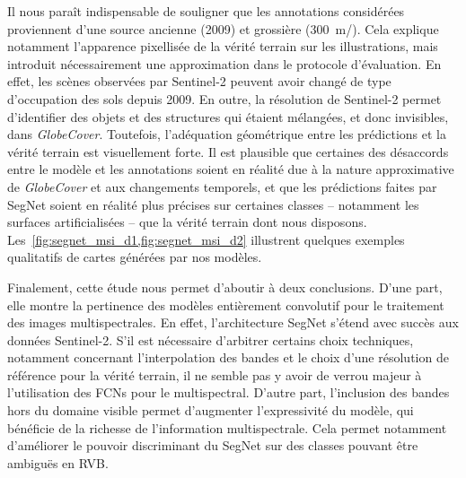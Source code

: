 Il nous paraît indispensable de souligner que les annotations considérées proviennent d'une source ancienne (2009) et grossière (\SI{300}{\meter/\px}). Cela explique notamment l'apparence pixellisée de la vérité terrain sur les illustrations, mais introduit nécessairement une approximation dans le protocole d'évaluation. En effet, les scènes observées par Sentinel-2 peuvent avoir changé de type d'occupation des sols depuis 2009. En outre, la résolution de Sentinel-2 permet d'identifier des objets et des structures qui étaient mélangées, et donc invisibles, dans \emph{GlobeCover}. Toutefois, l'adéquation géométrique entre les prédictions et la vérité terrain est visuellement forte. Il est plausible que certaines des désaccords entre le modèle et les annotations soient en réalité due à la nature approximative de \emph{GlobeCover} et aux changements temporels, et que les prédictions faites par SegNet soient en réalité plus précises sur certaines classes -- notamment les surfaces artificialisées -- que la vérité terrain dont nous disposons. Les~\cref{fig:segnet_msi_d1,fig:segnet_msi_d2} illustrent quelques exemples qualitatifs de cartes générées par nos modèles.

Finalement, cette étude nous permet d'aboutir à deux conclusions. D'une part, elle montre la pertinence des modèles entièrement convolutif pour le traitement des images multispectrales. En effet, l'architecture SegNet s'étend avec succès aux données Sentinel-2. S'il est nécessaire d'arbitrer certains choix techniques, notamment concernant l'interpolation des bandes et le choix d'une résolution de référence pour la vérité terrain, il ne semble pas y avoir de verrou majeur à l'utilisation des \glspl{FCN} pour le multispectral. D'autre part, l'inclusion des bandes hors du domaine visible permet d'augmenter l'expressivité du modèle, qui bénéficie de la richesse de l'information multispectrale. Cela permet notamment d'améliorer le pouvoir discriminant du SegNet sur des classes pouvant être ambiguës en \gls{RVB}.

